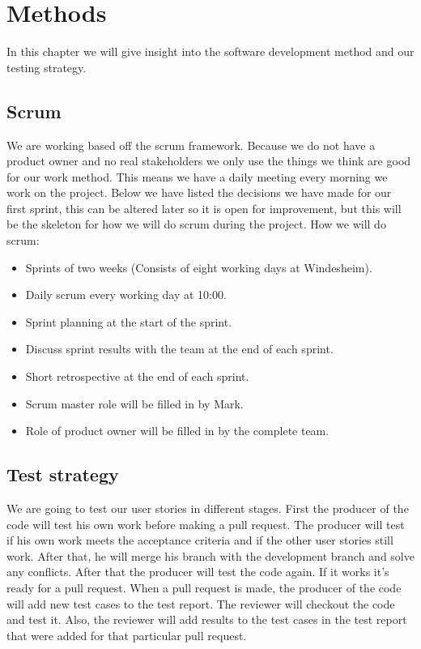 \section{Methods}
In this chapter we will give insight into the software development method and our testing strategy. 

\subsection{Scrum}
We are working based off the scrum framework. Because we do not have a product owner and no real stakeholders we only use the things we think are good for our work method. This means we have a daily meeting every morning we work on the project. Below we have listed the decisions we have made for our first sprint, this can be altered later so it is open for improvement, but this will be the skeleton for how we will do scrum during the project.
How we will do scrum:
\begin{itemize}
  \item Sprints of two weeks (Consists of eight working days at Windesheim).
  \item Daily scrum every working day at 10:00.
  \item Sprint planning at the start of the sprint.
  \item Discuss sprint results with the team at the end of each sprint.
  \item Short retrospective at the end of each sprint.
  \item Scrum master role will be filled in by Mark.
  \item Role of product owner will be filled in by the complete team.
\end{itemize}

\subsection{Test strategy}
We are going to test our user stories in different stages. First the producer of the code will test his own work before making a pull request. The producer will test if his own work meets the acceptance criteria and if the other user stories still work. After that, he will merge his branch with the development branch and solve any conflicts. After that the producer will test the code again. If it works it's ready for a pull request. When a pull request is made, the producer of the code will add new test cases to the test report. The reviewer will checkout the code and test it. Also, the reviewer will add results to the test cases in the test report that were added for that particular pull request.

